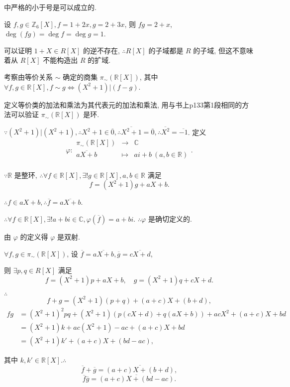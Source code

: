 \documentclass[UTF8]{ctexart}
\begin{document}
中严格的小于号是可以成立的.
\begin{example}
    设 $f,g\in\mathbb{Z}_6[X],f=1+2x,g=2+3x$, 则 $fg=2+x$, $\deg(fg)=\deg f=\deg g=1$.

    可以证明 $1+X\in R[X]$ 的逆不存在, $\therefore R[X]$ 的子域都是 $R$ 的子域, 但这不意味着从 $R[X]$ 不能构造出 $R$ 的扩域.
\end{example}
\begin{example}
    考察由等价关系 $\sim$ 确定的商集 $\pi_\sim(\mathbb{R}[X])$, 其中 $\forall f,g\in\mathbb{R}[X],f\sim g\Leftrightarrow(X^2+1)|(f-g)$.

    定义等价类的加法和乘法为其代表元的加法和乘法, 用与书上p133第1段相同的方法可以验证 $\pi_\sim(\mathbb{R}[X])$ 是环.

    $\because(X^2+1)|(X^2+1),\therefore X^2+1\in\overline{0},\therefore\overline{X^2+1}=\overline{0},\therefore\overline{X^2}=\overline{-1}$. 定义
    \[\varphi:\begin{array}{rcl}
        \pi_\sim(\mathbb{R}[X]) & \to & \mathbb{C} \\[6pt]
        \overline{aX+b} & \mapsto & ai+b\ (a,b\in\mathbb{R}) \\
    \end{array}.\]

    $\because\mathbb{R}$ 是整环, $\therefore\forall f\in\mathbb{R}[X],\exists!g\in\mathbb{R}[X],a,b\in\mathbb{R}$ 满足
    \[f=(X^2+1)g+aX+b.\]

    $\therefore f\in aX+b,\therefore\overline{f}=\overline{aX+b}$.

    $\therefore\forall f\in\mathbb{R}[X],\exists! a+bi\in\mathbb{C},\varphi(\overline{f})=a+bi$. $\therefore\varphi$ 是确切定义的.

    由 $\varphi$ 的定义得 $\varphi$ 是双射.

    $\forall f,g\in\pi_\sim(\mathbb{R}[X])$, 设 $\overline{f}=\overline{aX+b},\overline{g}=\overline{cX+d}$,

    则 $\exists p,q\in R[X]$ 满足
    \[f=(X^2+1)p+aX+b,\quad g=(X^2+1)q+cX+d.\]

    $\therefore$
    \[f+g=(X^2+1)(p+q)+(a+c)X+(b+d),\]
    \begin{align*}
        fg & =(X^2+1)^2pq+(X^2+1)(p(cX+d)+q(aX+b))+acX^2+(a+c)X+bd \\
        & =(X^2+1)k+ac(X^2+1)-ac+(a+c)X+bd \\
        & =(X^2+1)k'+(a+c)X+(bd-ac),
    \end{align*}

    其中 $k,k'\in\mathbb{R}[X].\therefore$
    \[\overline{f}+\overline{g}=\overline{(a+c)X+(b+d)},\]
    \[\overline{f}\overline{g}=\overline{(a+c)X+(bd-ac)}.\]


\end{example}
\end{document}
